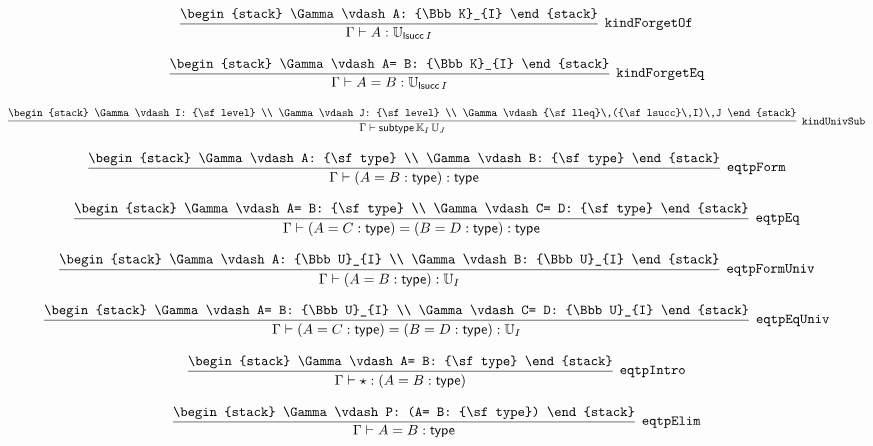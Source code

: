 \[
\infer[{\tt kindForgetOf}]{\Gamma \vdash A: {\Bbb U}_{{\sf lsucc}\,I}}{
\begin{stack}
\Gamma \vdash A: {\Bbb K}_{I}
\end{stack}}
\]

\[
\infer[{\tt kindForgetEq}]{\Gamma \vdash A= B: {\Bbb U}_{{\sf lsucc}\,I}}{
\begin{stack}
\Gamma \vdash A= B: {\Bbb K}_{I}
\end{stack}}
\]

\[
\infer[{\tt kindUnivSub}]{\Gamma \vdash {\sf subtype}\,{\Bbb K}_{I}\,{\Bbb U}_{J}}{
\begin{stack}
\Gamma \vdash I: {\sf level}
\\
\Gamma \vdash J: {\sf level}
\\
\Gamma \vdash {\sf lleq}\,({\sf lsucc}\,I)\,J
\end{stack}}
\]

\[
\infer[{\tt eqtpForm}]{\Gamma \vdash (A= B: {\sf type}): {\sf type}}{
\begin{stack}
\Gamma \vdash A: {\sf type}
\\
\Gamma \vdash B: {\sf type}
\end{stack}}
\]

\[
\infer[{\tt eqtpEq}]{\Gamma \vdash (A= C: {\sf type})= (B= D: {\sf type}): {\sf type}}{
\begin{stack}
\Gamma \vdash A= B: {\sf type}
\\
\Gamma \vdash C= D: {\sf type}
\end{stack}}
\]

\[
\infer[{\tt eqtpFormUniv}]{\Gamma \vdash (A= B: {\sf type}): {\Bbb U}_{I}}{
\begin{stack}
\Gamma \vdash A: {\Bbb U}_{I}
\\
\Gamma \vdash B: {\Bbb U}_{I}
\end{stack}}
\]

\[
\infer[{\tt eqtpEqUniv}]{\Gamma \vdash (A= C: {\sf type})= (B= D: {\sf type}): {\Bbb U}_{I}}{
\begin{stack}
\Gamma \vdash A= B: {\Bbb U}_{I}
\\
\Gamma \vdash C= D: {\Bbb U}_{I}
\end{stack}}
\]

\[
\infer[{\tt eqtpIntro}]{\Gamma \vdash \star : (A= B: {\sf type})}{
\begin{stack}
\Gamma \vdash A= B: {\sf type}
\end{stack}}
\]

\[
\infer[{\tt eqtpElim}]{\Gamma \vdash A= B: {\sf type}}{
\begin{stack}
\Gamma \vdash P: (A= B: {\sf type})
\end{stack}}
\]

